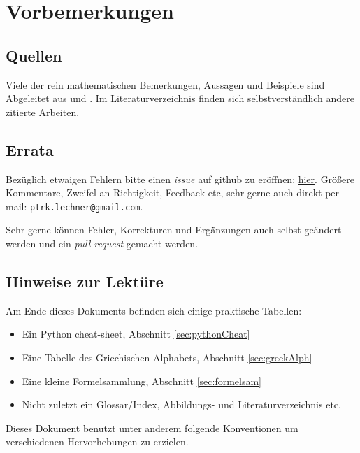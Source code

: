\chapter*{Vorbemerkungen}

\section*{Quellen}

Viele der rein mathematischen Bemerkungen, Aussagen und Beispiele sind Abgeleitet aus \cite{merziger2024repetitorium} und \cite{gollmann2017mathematik}. Im Literaturverzeichnis finden sich selbstverständlich andere zitierte Arbeiten.

\section*{Errata}

Bezüglich etwaigen Fehlern bitte einen \emph{issue} auf github zu eröffnen: \href{https://github.com/hrtlacek/matheFuerTonmeisterinnen/issues}{hier}. Größere Kommentare, Zweifel an Richtigkeit, Feedback etc, sehr gerne auch direkt per mail: \texttt{ptrk.lechner@gmail.com}.

Sehr gerne können Fehler, Korrekturen und Ergänzungen auch selbst geändert werden und ein \emph{pull request} gemacht werden.

\section*{Hinweise zur Lektüre}

Am Ende dieses Dokuments befinden sich einige praktische Tabellen:
\begin{itemize}
\item Ein Python cheat-sheet, Abschnitt \ref{sec:pythonCheat}
\item Eine Tabelle des Griechischen Alphabets, Abschnitt \ref{sec:greekAlph}
\item Eine kleine Formelsammlung, Abschnitt \ref{sec:formelsam}
\item Nicht zuletzt ein Glossar/Index, Abbildungs- und Literaturverzeichnis etc.
\end{itemize} 

Dieses Dokument benutzt unter anderem folgende Konventionen um verschiedenen Hervorhebungen zu erzielen. 

